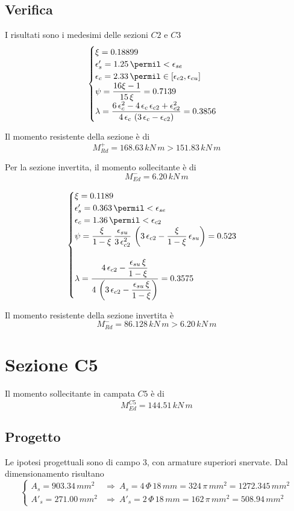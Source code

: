 \subsection{Verifica}
I risultati sono i medesimi delle sezioni $C2$ e $C3$
\[
\begin{cases}
	\xi = 0.18899\\
	\epsilon'_s = 1.25\,\permil < \epsilon_{se}\\
	\epsilon_c = 2.33\,\permil \in \left[\epsilon_{c2}, \epsilon_{cu}\right]\\
	\psi = \dfrac{16\xi -1}{15\,\xi} = 0.7139 \\
	\lambda = \dfrac{6\,\epsilon_{c}^2 - 4\,\epsilon_{c}\,\epsilon_{c2} + \epsilon_{c2}^2}{4\,\epsilon_{c}\,\left(3\,\epsilon_c - \epsilon_{c2}\right)} = 0.3856
\end{cases}
\]

Il momento resistente della sezione è di
\[
M_{Rd}^+ = 168.63\,kN\,m > 151.83\,kN\,m
\]

Per la sezione invertita, il momento sollecitante è di 
\[
M_{Ed}^{-} = 6.20\,kN\,m
\]

\[
\begin{cases}
	\xi = 0.1189\\
	\epsilon'_s = 0.363\,\permil<\epsilon_{se}\\
	\epsilon_c = 1.36\,\permil < \epsilon_{c2}\\
	\psi = \dfrac{\xi}{1-\xi}\,\dfrac{\epsilon_{su}}{3\,\epsilon_{c2}^2}\,\left(3\,\epsilon_{c2} - \dfrac{\xi}{1-\xi}\,\epsilon_{su}\right) = 0.523\\\\
	\lambda = \dfrac{4\,\epsilon_{c2} - \dfrac{\epsilon_{su}\,\xi}{1-\xi}}{4\,\left(3\,\epsilon_{c2} - \dfrac{\epsilon_{su}\,\xi}{1-\xi}\right)} = 0.3575
\end{cases}
\]

Il momento resistente della sezione invertita è
\[
M_{Rd}^- = 86.128\,kN\,m > 6.20\,kN\,m
\]

\section{Sezione C5}\label{sec:c5}
Il momento sollecitante in campata $C5$ è di 
\[
M_{Ed}^{C5} = 144.51\,kN\,m
\]
\subsection{Progetto}
Le ipotesi progettuali sono di campo 3, con armature superiori snervate. Dal dimensionamento risultano
\[
\begin{cases}
	A_s = 903.34\,mm^2 &\Longrightarrow~A_s = 4\,\Phi\,18\,mm = 324\,\pi\,mm^2 = 1272.345\,mm^2\\
	A'_s = 271.00\,mm^2 &\Longrightarrow~ A'_s = 2\,\Phi\,18\,mm = 162\,\pi\,mm^2 = 508.94\,mm^2
\end{cases}
\]

